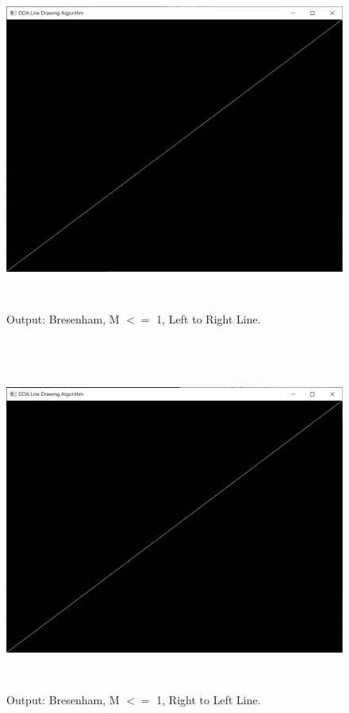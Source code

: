 \documentclass[12pt, a4]{article}
\begin{document}
\subsection*{}
\begin{figure}[h]
\centering
\caption{Output: Bresenham, M $<=$ 1, Left to Right Line.}
\includegraphics[height=11.25cm, width=15cm]{Outputs/1-Bresenham.png}
\end{figure}

\newpage
\subsection*{}
\begin{figure}[h]
\centering
\caption{Output: Bresenham, M $<=$ 1, Right to Left Line.}
\includegraphics[height=11.25cm, width=15cm]{Outputs/2-Bresenham.png}
\end{figure}
\end{document}

